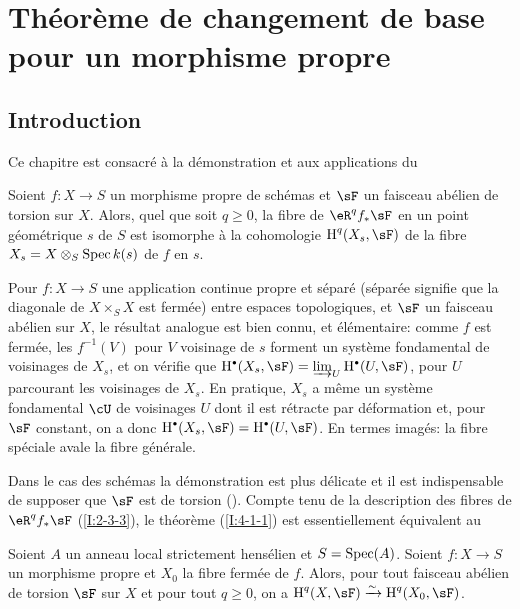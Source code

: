 \section{Théorème de changement de base pour un morphisme propre}\label{I:4}










\subsection{Introduction}\label{I:4-1}

Ce chapitre est consacré à la démonstration et aux applications du 





\begin{theorem}\label{I:4-1-1}
Soient $f:X\to S$ un morphisme propre de schémas et $\sF$ un faisceau abélien 
de torsion sur $X$. Alors, quel que soit $q\geqslant 0$, la fibre de 
$\eR^q f_* \sF$ en un point géométrique $s$ de $S$ est isomorphe à la 
cohomologie $\h^q(X_s,\sF)$ de la fibre $X_s=X\otimes_S \operatorname{Spec} k(s)$ de $f$ en 
$s$. 
\end{theorem}

Pour $f:X\to S$ une application continue propre et séparé (séparée 
signifie que la diagonale de $X\times_S X$ est fermée) entre espaces 
topologiques, et $\sF$ un faisceau abélien sur $X$, le résultat analogue est 
bien connu, et élémentaire: comme $f$ est fermée, les $f^{-1}(V)$ pour 
$V$ voisinage de $s$ forment un système fondamental de voisinages de $X_s$, et 
on vérifie que $\h^\bullet(X_s,\sF) = \varinjlim_U \h^\bullet(U,\sF)$, pour $U$ parcourant les 
voisinages de $X_s$. En pratique, $X_s$ a même un système fondamental 
$\cU$ de voisinages $U$ dont il est rétracte par déformation et, pour $\sF$ 
constant, on a donc $\h^\bullet(X_s,\sF)=\h^\bullet(U,\sF)$. En termes imagés: la fibre 
spéciale avale la fibre générale. 

Dans le cas des schémas la démonstration est plus délicate et il est 
indispensable de supposer que $\sF$ est de torsion (\cite[XII.2]{sga4}). Compte 
tenu de la description des fibres de $\eR^q f_* \sF$ (\ref{I:2-3-3}), le théorème 
(\ref{I:4-1-1}) est essentiellement équivalent au 

 
  
   
    
\begin{theorem}\label{I:4-1-2}
Soient $A$ un anneau local strictement hensélien et $S=\operatorname{Spec}(A)$. Soient 
$f:X\to S$ un morphisme propre et $X_0$ la fibre fermée de $f$. Alors, pour 
tout faisceau abélien de torsion $\sF$ sur $X$ et pour tout $q\geqslant 0$, on 
a $\h^q(X,\sF) \iso \h^q(X_0,\sF)$. 
\end{theorem} 

